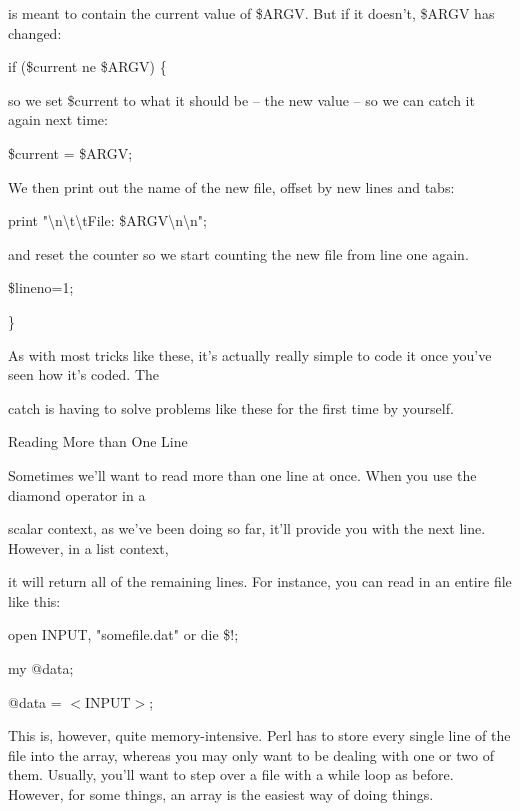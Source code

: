 \documentclass[a4paper,11pt]{book}
\begin{document}
\noindent is meant to contain the current value of \$ARGV. But if it doesn't, \$ARGV has changed:

\noindent 

\noindent if (\$current ne \$ARGV) \{

\noindent 

\noindent so we set \$current to what it should be -- the new value -- so we can catch it again next time:

\noindent 

\noindent \$current = \$ARGV;

\noindent 

\noindent We then print out the name of the new file, offset by new lines and tabs:

\noindent 

\noindent print "\textbackslash n\textbackslash t\textbackslash tFile: \$ARGV\textbackslash n\textbackslash n";

\noindent 

\noindent and reset the counter so we start counting the new file from line one again.

\noindent 

\noindent \$lineno=1;

\noindent \}

\noindent 

\noindent As with most tricks like these, it's actually really simple to code it once you've seen how it's coded. The

\noindent catch is having to solve problems like these for the first time by yourself.

\noindent 

\noindent Reading More than One Line

\noindent Sometimes we'll want to read more than one line at once. When you use the diamond operator in a

\noindent scalar context, as we've been doing so far, it'll provide you with the next line. However, in a list context,

\noindent it will return all of the remaining lines. For instance, you can read in an entire file like this:

\noindent 

\noindent open INPUT, "somefile.dat" or die \$!;

\noindent my @data;

\noindent @data = $<$INPUT$>$;

\noindent 

\noindent This is, however, quite memory-intensive. Perl has to store every single line of the file into the array, whereas you may only want to be dealing with one or two of them. Usually, you'll want to step over a file with a while loop as before. However, for some things, an array is the easiest way of doing things.
\end{document}
